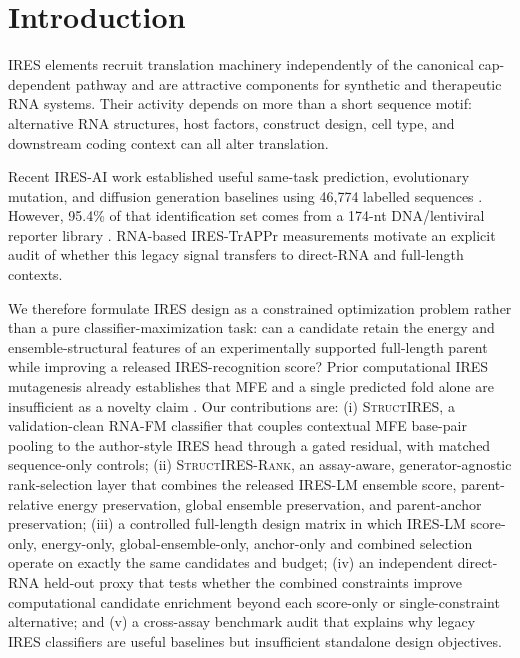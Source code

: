 \section{Introduction}

IRES elements recruit translation machinery independently of the canonical cap-dependent pathway
and are attractive components for synthetic and therapeutic RNA systems. Their activity depends on
more than a short sequence motif: alternative RNA structures, host factors, construct design, cell
type, and downstream coding context can all alter translation.

Recent IRES-AI work established useful same-task prediction, evolutionary mutation, and diffusion
generation baselines using 46,774 labelled sequences \cite{chu2026iresai}. However, 95.4\% of that
identification set comes from a 174-nt DNA/lentiviral reporter library \cite{weingarten2016ires}.
RNA-based IRES-TrAPPr measurements \cite{may2026irestrappr} motivate an explicit audit of whether
this legacy signal transfers to direct-RNA and full-length contexts.

We therefore formulate IRES design as a constrained optimization problem rather than a pure
classifier-maximization task: can a candidate retain the energy and ensemble-structural features
of an experimentally supported full-length parent while improving a released IRES-recognition
score? Prior computational IRES mutagenesis already establishes that MFE and a single predicted
fold alone are insufficient as a novelty claim \cite{delliponti2026structure}. Our contributions are:
(i) \textsc{StructIRES}, a validation-clean RNA-FM classifier that couples contextual MFE
base-pair pooling to the author-style IRES head through a gated residual, with matched
sequence-only controls; (ii) \textsc{StructIRES-Rank}, an assay-aware, generator-agnostic
rank-selection layer that combines the released IRES-LM ensemble score, parent-relative energy
preservation, global ensemble preservation, and parent-anchor preservation; (iii) a controlled
full-length design matrix in which IRES-LM score-only, energy-only, global-ensemble-only,
anchor-only and combined selection operate on exactly the same candidates and budget; (iv) an
independent direct-RNA held-out proxy that tests whether the combined constraints improve
computational candidate enrichment beyond each score-only or single-constraint alternative; and
(v) a cross-assay benchmark audit that explains why legacy IRES classifiers are useful baselines
but insufficient standalone design objectives.
